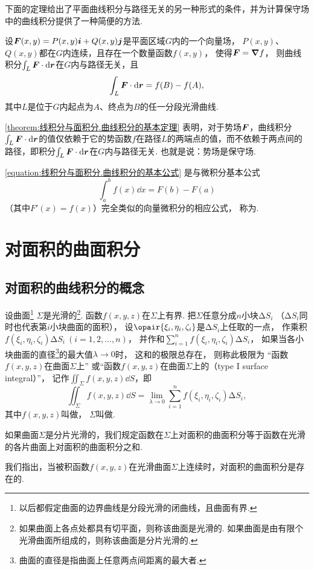 下面的定理给出了平面曲线积分与路径无关的另一种形式的条件，并为计算保守场中的曲线积分提供了一种简便的方法.
\begin{theorem}[曲线积分的基本定理]\label{theorem:线积分与面积分.曲线积分的基本定理}
设\(\boldsymbol{F}(x,y)=P(x,y)\boldsymbol{i}+Q(x,y)\boldsymbol{j}\)是平面区域\(G\)内的一个向量场，
\(P(x,y)\)、\(Q(x,y)\)都在\(G\)内连续，且存在一个数量函数\(f(x,y)\)，
使得\(\boldsymbol{F}=\grad{f}\)，
则曲线积分\(\int_L{\boldsymbol{F}\cdot\dd{\boldsymbol{r}}}\)在\(G\)内与路径无关，且
\begin{equation}\label{equation:线积分与面积分.曲线积分的基本公式}
\int_L \boldsymbol{F} \cdot \dd{\boldsymbol{r}}
= f(B)-f(A),
\end{equation}
其中\(L\)是位于\(G\)内起点为\(A\)、终点为\(B\)的任一分段光滑曲线.
\end{theorem}
\cref{theorem:线积分与面积分.曲线积分的基本定理} 表明，对于势场\(\boldsymbol{F}\)，曲线积分\(\int_L \boldsymbol{F}\cdot\dd{\boldsymbol{r}}\)的值仅依赖于它的势函数\(f\)在路径\(L\)的两端点的值，而不依赖于两点间的路径，即积分\(\int_L \boldsymbol{F}\cdot\dd{\boldsymbol{r}}\)在\(G\)内与路径无关.
也就是说：势场是保守场.

\cref{equation:线积分与面积分.曲线积分的基本公式}
是与微积分基本公式\[
\int_a^b f(x) \dd{x}
= F(b) - F(a)
\]（其中\(F'(x) = f(x)\)）完全类似的向量微积分的相应公式，
称为.

\section{对面积的曲面积分}
\subsection{对面积的曲线积分的概念}
\begin{definition}
设曲面\footnote{以后都假定曲面的边界曲线是分段光滑的闭曲线，且曲面有界.}%
\(\Sigma\)是光滑的\footnote{如果曲面上各点处都具有切平面，则称该曲面是光滑的.
如果曲面是由有限个光滑曲面所组成的，则称该曲面是分片光滑的.}.
函数\(f(x,y,z)\)在\(\Sigma\)上有界.
把\(\Sigma\)任意分成\(n\)小块\(\increment S_i\)
（\(\increment S_i\)同时也代表第\(i\)小块曲面的面积），
设\(\opair{\xi_i,\eta_i,\zeta_i}\)是\(\increment S_i\)上任取的一点，
作乘积\(f(\xi_i,\eta_i,\zeta_i) \increment S_i\ (i=1,2,\dotsc,n)\)，
并作和\(\sum\limits_{i=1}^n f(\xi_i,\eta_i,\zeta_i) \increment S_i\)，
如果当各小块曲面的直径\footnote{%
曲面的直径是指曲面上任意两点间距离的最大者.}的最大值\(\lambda\to0\)时，
这和的极限总存在，
则称此极限为
“函数\(f(x,y,z)\)在曲面\(\Sigma\)上”
或“函数\(f(x,y,z)\)在曲面\(\Sigma\)上的（type I surface integral）”，
记作\(\iint_{\Sigma}{f(x,y,z)\dd{S}}\)，即\[
	\iint_{\Sigma} f(x,y,z)\dd{S}
	= \lim\limits_{\lambda\to0} \sum\limits_{i=1}^n f(\xi_i,\eta_i,\zeta_i) \increment S_i,
\]
其中\(f(x,y,z)\)叫做，
\(\Sigma\)叫做.

如果曲面\(\Sigma\)是分片光滑的，我们规定函数在\(\Sigma\)上对面积的曲面积分等于函数在光滑的各片曲面上对面积的曲面积分之和.
\end{definition}
我们指出，当被积函数\(f(x,y,z)\)在光滑曲面\(\Sigma\)上连续时，对面积的曲面积分是存在的.

